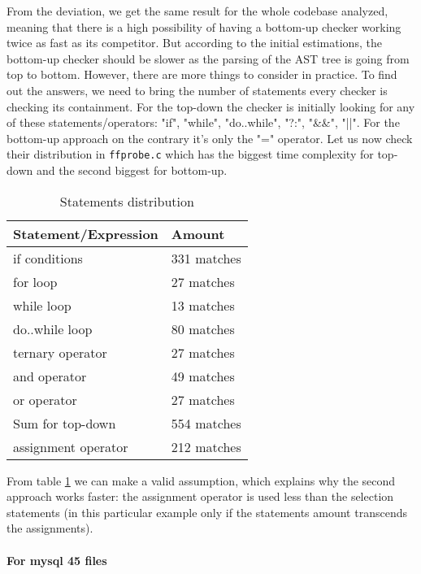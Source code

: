 From the deviation, we get the same result for the whole codebase analyzed, meaning that there is a high possibility of having a bottom-up checker working twice as fast as its competitor. But according to the initial estimations, the bottom-up checker should be slower as the parsing of the AST tree is going from top to bottom. However, there are more things to consider in practice. To find out the answers, we need to bring the number of statements every checker is checking its containment. For the top-down the checker is initially looking for any of these statements/operators:  "if",  "while", "do..while", "?:", "\&\&", "||". For the bottom-up approach on the contrary it's only the "=" operator. Let us now check their distribution in \lstinline{ffprobe.c} which has the biggest time complexity for top-down and the second biggest for bottom-up.


\begin{table}[H]
    \centering
    \begin{tabular}{|m{}|m{}|}
        \hline
        \textbf{Statement/Expression} & \textbf{Amount}  \\
        \hline
        if conditions  &  331 matches \\
        for loop  &  27 matches \\
        while loop  &  13 matches \\
        do..while loop  & 80 matches \\
        ternary operator  & 27 matches \\
        and operator  & 49 matches \\
        or operator  & 27 matches \\
        \hline 
        Sum for top-down & 554 matches \\
        \hline 
        assignment operator &  212 matches \\
        \hline 
    \end{tabular}
    \caption{Statements distribution}
    \label{tab:stmt-dist}
\end{table}

From table \ref{tab:stmt-dist} we can make a valid assumption, which explains why the second approach works faster: the assignment operator is used less than the selection statements (in this particular example only if the statements amount transcends the assignments). 

\paragraph{For mysql 45 files \\}

